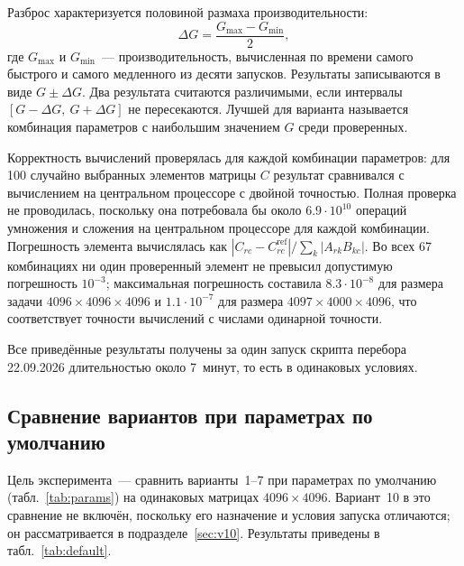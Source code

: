 \documentclass[a4paper]{article}
\begin{document}
Разброс характеризуется половиной размаха производительности:
$$
\Delta G = \frac{G_{\max}-G_{\min}}{2},
$$
где $G_{\max}$ и $G_{\min}$~--- производительность, вычисленная по
времени самого быстрого и самого медленного из десяти запусков.
Результаты записываются в виде $G \pm \Delta G$. Два результата
считаются различимыми, если интервалы $[G - \Delta G,\ G + \Delta G]$
не пересекаются. Лучшей для варианта называется комбинация параметров
с наибольшим значением $G$ среди проверенных.

Корректность вычислений проверялась для каждой комбинации параметров:
для 100 случайно выбранных элементов матрицы $C$ результат сравнивался
с вычислением на центральном процессоре с двойной точностью. Полная
проверка не проводилась, поскольку она потребовала бы около
$6.9 \cdot 10^{10}$ операций умножения и сложения на центральном
процессоре для каждой комбинации. Погрешность элемента вычислялась как
$\left|C_{rc} - C^{\mathrm{ref}}_{rc}\right| / \sum_k \left|A_{rk} B_{kc}\right|$.
Во всех 67 комбинациях ни один проверенный элемент не превысил
допустимую погрешность $10^{-3}$; максимальная погрешность составила
$8.3 \cdot 10^{-8}$ для размера задачи $4096 \times 4096 \times 4096$
и $1.1 \cdot 10^{-7}$ для размера $4097 \times 4000 \times 4096$, что
соответствует точности вычислений с числами одинарной точности.

Все приведённые результаты получены за один запуск скрипта перебора
22.09.2026 длительностью около 7~минут, то есть в одинаковых условиях.

\subsection{Сравнение вариантов при параметрах по умолчанию}
\label{sec:default}

Цель эксперимента~--- сравнить варианты~1--7 при параметрах по
умолчанию (табл.~\ref{tab:params}) на одинаковых матрицах
$4096 \times 4096$. Вариант~10 в это сравнение не включён, поскольку
его назначение и условия запуска отличаются; он рассматривается в
подразделе~\ref{sec:v10}. Результаты приведены в
табл.~\ref{tab:default}.
\end{document}
